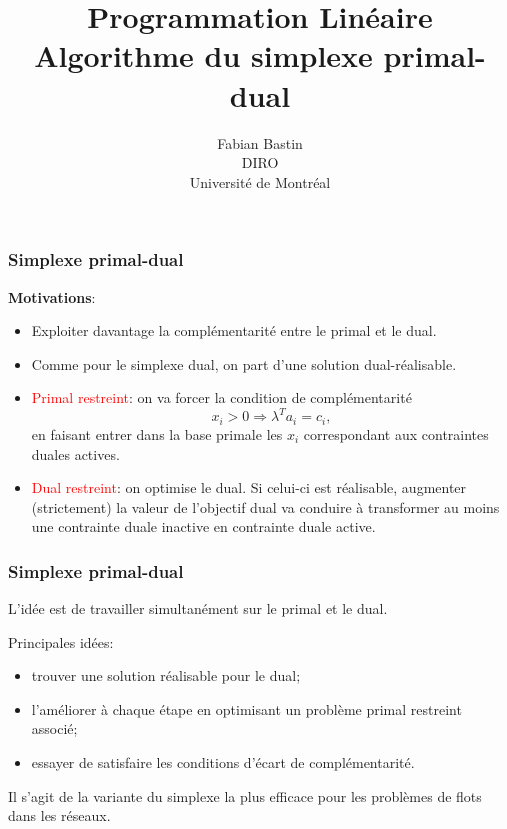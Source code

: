 \documentclass[t, aspectratio=169, usepdftitle=false]{beamer}
\title[Simplexe primal-dual]{Programmation Linéaire\\Algorithme du simplexe primal-dual}
\author[Fabian Bastin]{Fabian Bastin\\DIRO\\Université de Montréal}
\date{}
\begin{document}
\frame{\titlepage}

\begin{frame}
\frametitle{Simplexe primal-dual}

{\bf Motivations}:
\begin{itemize}
\item
Exploiter davantage la complémentarité entre le primal et le dual.
\item
Comme pour le simplexe dual, on part d'une solution dual-réalisable.
\item
\textcolor{red}{Primal restreint}: on va forcer la condition de complémentarité
\[
x_i > 0 \Rightarrow \lambda^T a_i = c_i,
\]
en faisant entrer dans la base primale les $x_i$ correspondant aux contraintes duales actives.
\item
\textcolor{red}{Dual restreint}: on optimise le dual. Si celui-ci est réalisable, augmenter (strictement) la valeur de l'objectif dual va conduire à transformer au moins une contrainte duale inactive en contrainte duale active.
\end{itemize}

\end{frame}

\begin{frame}
\frametitle{Simplexe primal-dual}

L'idée est de travailler simultanément sur le primal et le dual.

\mbox{}

Principales idées:
\begin{itemize}
\item
trouver une solution réalisable pour le dual;
\item
l'améliorer à chaque étape en optimisant un problème primal restreint associé;
\item
essayer de satisfaire les conditions d'écart de complémentarité.
\end{itemize}

\mbox{}

Il s'agit de la variante du simplexe la plus efficace pour les problèmes de flots dans les réseaux.

\end{frame}
\end{document}
